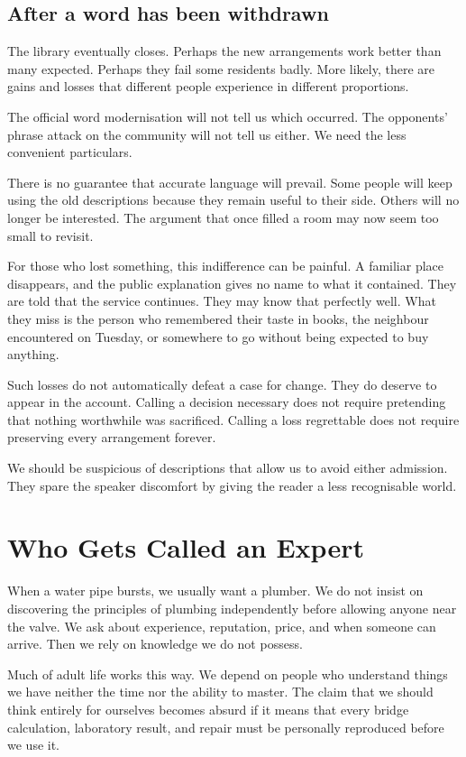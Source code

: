\documentclass[12pt,a4paper]{book}
\begin{document}
\section*{After a word has been withdrawn}

The library eventually closes. Perhaps the new arrangements work better than many expected. Perhaps they fail some residents badly. More likely, there are gains and losses that different people experience in different proportions.

The official word modernisation will not tell us which occurred. The opponents' phrase attack on the community will not tell us either. We need the less convenient particulars.

There is no guarantee that accurate language will prevail. Some people will keep using the old descriptions because they remain useful to their side. Others will no longer be interested. The argument that once filled a room may now seem too small to revisit.

For those who lost something, this indifference can be painful. A familiar place disappears, and the public explanation gives no name to what it contained. They are told that the service continues. They may know that perfectly well. What they miss is the person who remembered their taste in books, the neighbour encountered on Tuesday, or somewhere to go without being expected to buy anything.

Such losses do not automatically defeat a case for change. They do deserve to appear in the account. Calling a decision necessary does not require pretending that nothing worthwhile was sacrificed. Calling a loss regrettable does not require preserving every arrangement forever.

We should be suspicious of descriptions that allow us to avoid either admission. They spare the speaker discomfort by giving the reader a less recognisable world.

\chapter{Who Gets Called an Expert}

When a water pipe bursts, we usually want a plumber. We do not insist on discovering the principles of plumbing independently before allowing anyone near the valve. We ask about experience, reputation, price, and when someone can arrive. Then we rely on knowledge we do not possess.

Much of adult life works this way. We depend on people who understand things we have neither the time nor the ability to master. The claim that we should think entirely for ourselves becomes absurd if it means that every bridge calculation, laboratory result, and repair must be personally reproduced before we use it.
\end{document}

